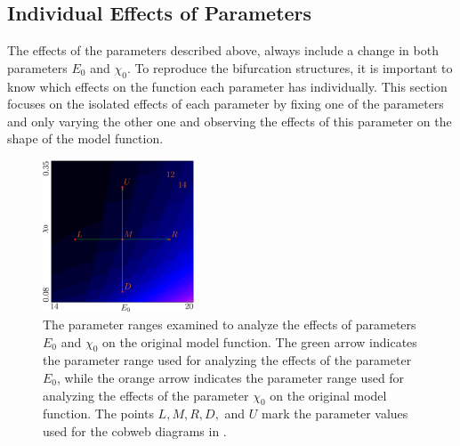\subsection{Individual Effects of Parameters}
\label{sec:setup.char.paramfx.individual}

The effects of the parameters described above, always include a change in both parameters $E_0$ and $\chi_0$.
To reproduce the bifurcation structures, it is important to know which effects on the function each parameter has individually.
This section focuses on the isolated effects of each parameter by fixing one of the parameters and only varying the other one and observing the effects of this parameter on the shape of the model function.

\begin{figure}
	\centering
	\includegraphics[width=0.4\textwidth]{../Figures/5/5.3/result.png}
	\caption[The parameter ranges examined to analyze the effects of parameters on the original model function]{
		The parameter ranges examined to analyze the effects of parameters $E_0$ and $\chi_0$ on the original model function.
		The green arrow indicates the parameter range used for analyzing the effects of the parameter $E_0$, while the orange arrow indicates the parameter range used for analyzing the effects of the parameter $\chi_0$ on the original model function.
		The points $L, M, R, D,$ and $U$ mark the parameter values used for the cobweb diagrams in .
	}
	\label{fig:setup.char.evolution.single.map}
\end{figure}

